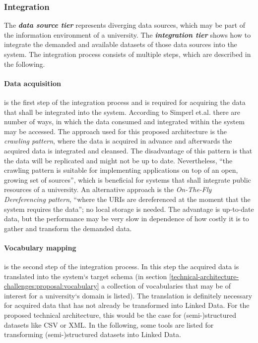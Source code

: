 \documentclass{article}
\begin{document}
\subsubsection{Integration}
\label{technical-architecture-challenges:proposal:integration}
The \textit{\textbf{data source tier}} represents diverging data sources, which may be part of the information environment of a university. The \textit{\textbf{integration tier}} shows how to integrate the demanded and available datasets of those data sources into the system. The integration process consists of multiple steps, which are described in the following.

\paragraph{Data acquisition} is the first step of the integration process and is required for acquiring the data that shall be integrated into the system. According to Simperl et.al.\cite{simperl_using_2013}\cite{heath_linked_2011} there are number of ways, in which the data consumed and integrated within the system may be accessed. The approach used for this proposed architecture is the \textit{crawling pattern}, where the data is acquired in advance and afterwards the acquired data is integrated and cleansed. The disadvantage of this pattern is that the data will be replicated and might not be up to date. Nevertheless, \enquote{the crawling pattern is suitable for implementing applications on top of an open, growing set of sources}\cite{heath_linked_2011}, which is beneficial for systems that shall integrate public resources of a university. An alternative approach is the \textit{On-The-Fly Dereferencing pattern}, \enquote{where the URIs are dereferenced at the moment that the system requires the data}; no local storage is needed. The advantage is up-to-date data, but the performance may be very slow in dependence of how costly it is to gather and transform the demanded data.





\paragraph{Vocabulary mapping} is the second step of the integration process. In this step the acquired data is translated into the system`s target schema (in section \ref{technical-architecture-challenges:proposal:vocabulary} a collection of vocabularies that may be of interest for a university`s domain is listed). The translation is definitely necessary for acquired data that has not already be transformed into Linked Data. For the proposed technical architecture, this would be the case for (semi-)structured datasets like CSV or XML. In the following, some tools are listed for transforming (semi-)structured datasets into Linked Data.
\end{document}
